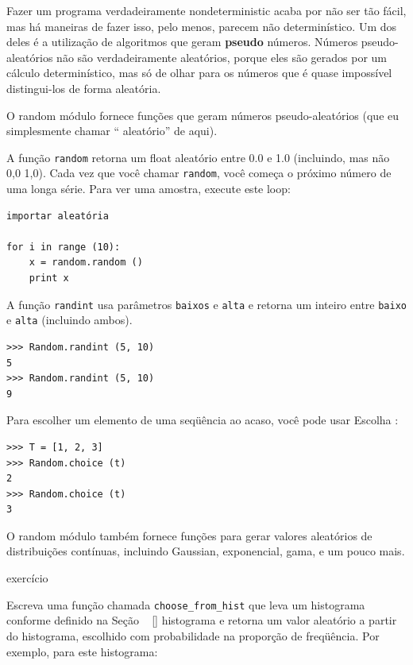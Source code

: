 \documentclass[10pt]{book}
\begin{document}
\begin{v erbatim}
Fazer um programa verdadeiramente nondeterministic acaba por não ser tão fácil,
mas há maneiras de fazer isso, pelo menos, parecem não determinístico. Um dos
deles é a utilização de algoritmos que geram {\bf pseudo} números.
Números pseudo-aleatórios não são verdadeiramente aleatórios, porque eles são gerados
por um cálculo determinístico, mas só de olhar para os números que
é quase impossível distingui-los de forma aleatória.

O {random \tt} módulo fornece funções que geram
números pseudo-aleatórios (que eu simplesmente chamar `` aleatório'' de
aqui).

A função {\tt random} retorna um float aleatório
entre 0.0 e 1.0 (incluindo, mas não 0,0 1,0). Cada vez que você
chamar {\tt random}, você começa o próximo número de uma longa série. Para ver uma
amostra, execute este loop:

\begin{verbatim}
importar aleatória

for i in range (10):
    x = random.random ()
    print x
\end{verbatim}
%
A função {\tt randint} usa parâmetros {\tt baixos} e
{\tt alta} e retorna um inteiro entre {\tt baixo} e
{\tt alta} (incluindo ambos).

\begin{verbatim}
>>> Random.randint (5, 10)
5
>>> Random.randint (5, 10)
9
\end{verbatim}
%
Para escolher um elemento de uma seqüência ao acaso, você pode usar
{Escolha \tt}:

\begin{verbatim}
>>> T = [1, 2, 3]
>>> Random.choice (t)
2
>>> Random.choice (t)
3
\end{verbatim}
%
O {random \tt} módulo também fornece funções para gerar
valores aleatórios de distribuições contínuas, incluindo
Gaussian, exponencial, gama, e um pouco mais.

\begin{} exercício

Escreva uma função chamada \verb "choose_from_hist" que leva
um histograma conforme definido na Seção ~ \ref {} histograma e retorna um 
valor aleatório a partir do histograma, escolhido com probabilidade
na proporção de freqüência. Por exemplo, para este histograma:


\end{}
\end{v erbatim}
\end{document}
